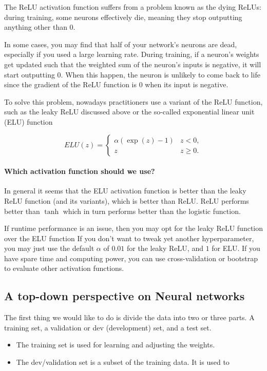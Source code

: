 \documentclass[%
oneside,                 %
final,                   %
10pt]{article}
\begin{document}
The ReLU activation function suffers from a problem known as the dying
ReLUs: during training, some neurons effectively die, meaning they
stop outputting anything other than 0.

In some cases, you may find that half of your network’s neurons are
dead, especially if you used a large learning rate. During training,
if a neuron’s weights get updated such that the weighted sum of the
neuron’s inputs is negative, it will start outputting 0. When this
happen, the neuron is unlikely to come back to life since the gradient
of the ReLU function is 0 when its input is negative.

To solve this problem, nowadays practitioners use a  variant of the ReLU
function, such as the leaky ReLU discussed above or the so-called
exponential linear unit (ELU) function

\[
ELU(z) = \left\{\begin{array}{cc} \alpha\left( \exp{(z)}-1\right) & z < 0,\\  z & z \ge 0.\end{array}\right. 
\]

\paragraph{Which activation function should we use?}
In general it seems that the ELU activation function is better than
the leaky ReLU function (and its variants), which is better than
ReLU. ReLU performs better than $\tanh$ which in turn performs better
than the logistic function. 

If runtime
performance is an issue, then you may opt for the  leaky ReLU function  over the 
ELU function If you don’t
want to tweak yet another hyperparameter, you may just use the default
$\alpha$ of $0.01$ for the leaky ReLU, and $1$ for ELU. If you have
spare time and computing power, you can use cross-validation or
bootstrap to evaluate other activation functions.


\subsection{A top-down perspective on Neural networks}

The first thing we would like to do is divide the data into two or three
parts. A training set, a validation or dev (development) set, and a
test set. 
\begin{itemize}
\item The training set is used for learning and adjusting the weights.

\item The dev/validation set is a subset of the training data. It is used to
\end{itemize}
\end{document}
